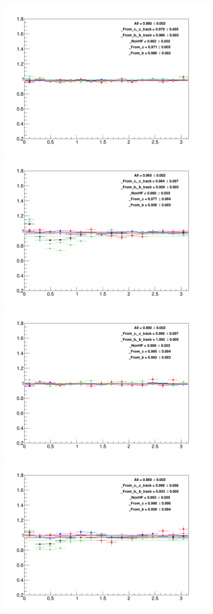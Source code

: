 \begin{figure}
{\includegraphics[width=.48\linewidth]{figures/MC_closure/MCClosure_Dzero_Canvas_PtIntBins6to8_PoolInt_thr03to1.png}}
{\includegraphics[width=.48\linewidth]{figures/MC_closure/MCClosure_Dzero_Canvas_PtIntBins6to8_PoolInt_thr1to99.png}} \\

{\includegraphics[width=.48\linewidth]{figures/MC_closure/MCClosure_Dzero_Canvas_PtIntBins9to11_PoolInt_thr03to1.png}}
{\includegraphics[width=.48\linewidth]{figures/MC_closure/MCClosure_Dzero_Canvas_PtIntBins9to11_PoolInt_thr1to99.png}}
\end{figure}
